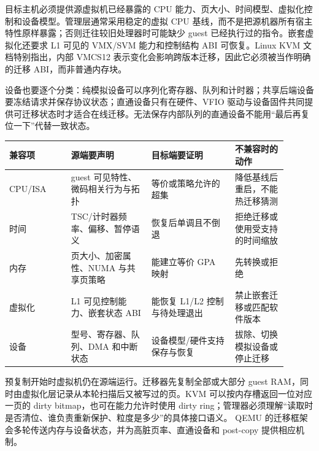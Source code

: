 目标主机必须提供源虚拟机已经暴露的 CPU 能力、页大小、时间模型、虚拟化控制和设备模型。管理层通常采用稳定的虚拟 CPU 基线，而不是把源机器所有宿主特性原样暴露；否则迁往较旧处理器时可能缺少 guest 已经执行过的指令。嵌套虚拟化还要求 L1 可见的 VMX/SVM 能力和控制结构 ABI 可恢复。Linux KVM 文档特别指出，内部 VMCS12 表示变化会影响跨版本迁移，因此它必须被当作明确的迁移 ABI，而非普通内存块。\cite{linux-nested-vmx}

设备也要逐个分类：纯模拟设备可以序列化寄存器、队列和计时器；共享后端设备要冻结请求并保存协议状态；直通设备只有在硬件、VFIO 驱动与设备固件共同提供可迁移状态时才适合在线迁移。无法保存内部队列的直通设备不能用“最后再复位一下”代替一致状态。

\begin{longtable}{L{0.20\linewidth}L{0.26\linewidth}L{0.27\linewidth}L{0.17\linewidth}}
\toprule
兼容项 & 源端要声明 & 目标端要证明 & 不兼容时的动作 \\
\midrule
CPU/ISA & guest 可见特性、微码相关行为与拓扑 & 等价或策略允许的超集 & 降低基线后重启，不能热迁移猜测 \\\tablerowrule
时间 & TSC/计时器频率、偏移、暂停语义 & 恢复后单调且不倒退 & 拒绝迁移或使用受支持的时间缩放 \\\tablerowrule
内存 & 页大小、加密属性、NUMA 与共享页策略 & 能建立等价 GPA 映射 & 先转换或拒绝 \\\tablerowrule
虚拟化 & L1 可见控制能力、嵌套状态 ABI & 能恢复 L1/L2 控制与待处理退出 & 禁止嵌套迁移或匹配软件版本 \\\tablerowrule
设备 & 型号、寄存器、队列、DMA 和中断状态 & 设备模型/硬件支持保存与恢复 & 拔除、切换模拟设备或停止迁移 \\
\bottomrule
\end{longtable}


预复制开始时虚拟机仍在源端运行。迁移器先复制全部或大部分 guest RAM，同时由虚拟化层记录从本轮扫描后又被写过的页。KVM 可以按内存槽返回一位对应一页的 dirty bitmap，也可在能力允许时使用 dirty ring；管理器必须理解“读取时是否清位、谁负责重新保护、粒度是多少”的具体接口语义。\cite{linux-kvm-api} QEMU 的迁移框架会多轮传送内存与设备状态，并为高脏页率、直通设备和 post-copy 提供相应机制。\cite{qemu-migration}

